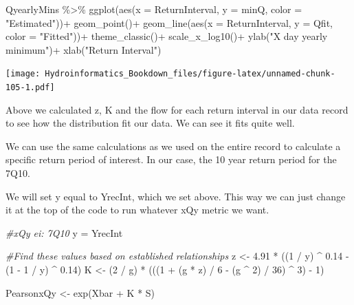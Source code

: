 \documentclass[
]{book}
\newenvironment{Shaded}{\begin{snugshade}}{\end{snugshade}}
\newcommand{\AttributeTok}[1]{\textcolor[rgb]{0.77,0.63,0.00}{#1}}
\newcommand{\CommentTok}[1]{\textcolor[rgb]{0.56,0.35,0.01}{\textit{#1}}}
\newcommand{\DecValTok}[1]{\textcolor[rgb]{0.00,0.00,0.81}{#1}}
\newcommand{\FloatTok}[1]{\textcolor[rgb]{0.00,0.00,0.81}{#1}}
\newcommand{\FunctionTok}[1]{\textcolor[rgb]{0.00,0.00,0.00}{#1}}
\newcommand{\NormalTok}[1]{#1}
\newcommand{\OtherTok}[1]{\textcolor[rgb]{0.56,0.35,0.01}{#1}}
\newcommand{\SpecialCharTok}[1]{\textcolor[rgb]{0.00,0.00,0.00}{#1}}
\newcommand{\StringTok}[1]{\textcolor[rgb]{0.31,0.60,0.02}{#1}}
\begin{document}
\begin{Shaded}
\begin{Highlighting}[]
\NormalTok{QyearlyMins }\SpecialCharTok{\%\textgreater{}\%} 
  \FunctionTok{ggplot}\NormalTok{(}\FunctionTok{aes}\NormalTok{(}\AttributeTok{x =}\NormalTok{ ReturnInterval, }\AttributeTok{y =}\NormalTok{ minQ, }\AttributeTok{color =} \StringTok{"Estimated"}\NormalTok{))}\SpecialCharTok{+}
  \FunctionTok{geom\_point}\NormalTok{()}\SpecialCharTok{+}
  \FunctionTok{geom\_line}\NormalTok{(}\FunctionTok{aes}\NormalTok{(}\AttributeTok{x =}\NormalTok{ ReturnInterval, }\AttributeTok{y =}\NormalTok{ Qfit, }\AttributeTok{color =} \StringTok{"Fitted"}\NormalTok{))}\SpecialCharTok{+}
  \FunctionTok{theme\_classic}\NormalTok{()}\SpecialCharTok{+}
  \FunctionTok{scale\_x\_log10}\NormalTok{()}\SpecialCharTok{+}
  \FunctionTok{ylab}\NormalTok{(}\StringTok{"X day yearly minimum"}\NormalTok{)}\SpecialCharTok{+}
  \FunctionTok{xlab}\NormalTok{(}\StringTok{"Return Interval"}\NormalTok{)}
\end{Highlighting}
\end{Shaded}

\texttt{[image: Hydroinformatics\_Bookdown\_files/figure-latex/unnamed-chunk-105-1.pdf]}

Above we calculated z, K and the flow for each return interval in our data record to see how the distribution fit our data. We can see it fits quite well.

We can use the same calculations as we used on the entire record to calculate a specific return period of interest. In our case, the 10 year return period for the 7Q10.

We will set y equal to YrecInt, which we set above. This way we can just change it at the top of the code to run whatever xQy metric we want.

\begin{Shaded}
\begin{Highlighting}[]
\CommentTok{\#xQy ei: 7Q10}
\NormalTok{y }\OtherTok{=}\NormalTok{ YrecInt}

\CommentTok{\#Find these values based on established relationships}
\NormalTok{z    }\OtherTok{\textless{}{-}} \FloatTok{4.91} \SpecialCharTok{*}\NormalTok{ ((}\DecValTok{1} \SpecialCharTok{/}\NormalTok{ y) }\SpecialCharTok{\^{}} \FloatTok{0.14} \SpecialCharTok{{-}}\NormalTok{ (}\DecValTok{1} \SpecialCharTok{{-}} \DecValTok{1} \SpecialCharTok{/}\NormalTok{ y) }\SpecialCharTok{\^{}} \FloatTok{0.14}\NormalTok{)}
\NormalTok{K    }\OtherTok{\textless{}{-}}\NormalTok{ (}\DecValTok{2} \SpecialCharTok{/}\NormalTok{ g) }\SpecialCharTok{*}\NormalTok{ (((}\DecValTok{1} \SpecialCharTok{+}\NormalTok{ (g }\SpecialCharTok{*}\NormalTok{ z) }\SpecialCharTok{/} \DecValTok{6} \SpecialCharTok{{-}}\NormalTok{ (g }\SpecialCharTok{\^{}} \DecValTok{2}\NormalTok{) }\SpecialCharTok{/} \DecValTok{36}\NormalTok{) }\SpecialCharTok{\^{}} \DecValTok{3}\NormalTok{) }\SpecialCharTok{{-}} \DecValTok{1}\NormalTok{) }

\NormalTok{PearsonxQy }\OtherTok{\textless{}{-}} \FunctionTok{exp}\NormalTok{(Xbar }\SpecialCharTok{+}\NormalTok{ K }\SpecialCharTok{*}\NormalTok{ S)}
\end{Highlighting}
\end{Shaded}
\end{document}
